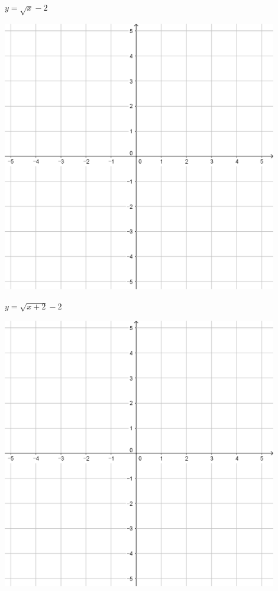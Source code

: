 \documentclass{oblivoir}
\begin{document}
\begin{minipage}{0.45\textwidth}\centering
\(y=\sqrt{x}-2\)
\par\bigskip\includegraphics[width=0.9\textwidth]{55}
\end{minipage}
\begin{minipage}{0.45\textwidth}\centering
\(y=\sqrt{x+2}-2\)
\par\bigskip\includegraphics[width=0.9\textwidth]{55}
\end{minipage}\bigskip\bigskip\par
\end{document}
